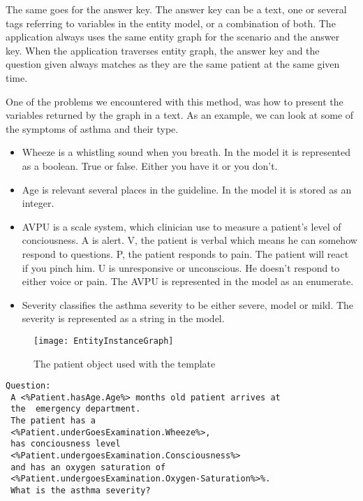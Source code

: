 The same goes for the answer key. The answer key can be a text, one or several tags referring to variables in the entity model, or a combination of both. The application always uses the same entity graph for the scenario and the answer key. When the application traverses entity graph, the answer key and the question given always matches as they are the same patient at the same given time.

One of the problems we encountered with this method, was how to present the variables returned by the graph in a text. As an example, we can look at some of the symptoms of asthma and their type.
\begin{itemize}
	\item Wheeze is a whistling sound when you breath. In the model it is represented as a boolean. True or false. Either you have it or you don't.
	\item Age is relevant several places in the guideline. In the model it is stored as an integer.
	\item AVPU is a scale system, which clinician use to measure a patient's level of conciousness. A is alert. V, the patient is verbal which means he can somehow respond to questions. P, the patient responds to pain. The patient will react if you pinch him. U is unresponsive or unconscious. He doesn't respond to either voice or pain. The AVPU is represented in the model as an enumerate.
	\item Severity classifies the asthma severity to be either severe, model or mild. The severity is represented as a string in the model.
\end{itemize}

\begin{figure}[h!]
	\texttt{[image: EntityInstanceGraph]}
	\caption {The patient object used with the template}
	\label{fig:EntityInstanceGraph}
\end{figure}

\begin{lstlisting}[caption={Question template}, frame=single, captionpos=b] 
Question:
 A <%Patient.hasAge.Age%> months old patient arrives at 
 the  emergency department. 
 The patient has a 
 <%Patient.underGoesExamination.Wheeze%>,
 has conciousness level 
 <%Patient.undergoesExamination.Consciousness%> 
 and has an oxygen saturation of 
 <%Patient.undergoesExamination.Oxygen-Saturation%>%. 
 What is the asthma severity? 
 \end{lstlisting}
 
